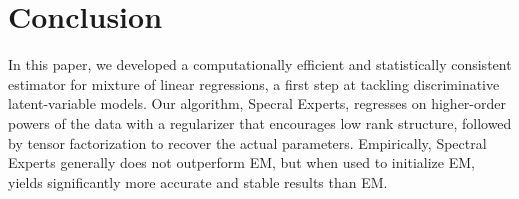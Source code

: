 \section{Conclusion}
\label{sec:conclusion}

In this paper, we developed a computationally efficient and statistically
consistent estimator for mixture of linear regressions, a first step at
tackling discriminative latent-variable models.  Our algorithm, Specral
Experts, regresses on higher-order powers of the data with a regularizer that
encourages low rank structure, followed by tensor factorization to recover the
actual parameters.  Empirically, Spectral Experts generally does not outperform
EM, but when used to initialize EM, yields significantly more accurate and
stable results than EM.
